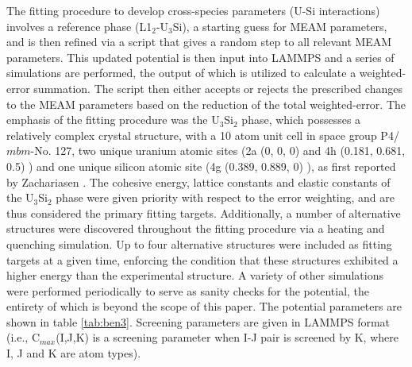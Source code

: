 \documentclass[review]{elsarticle}
\begin{document}
The fitting procedure to develop cross-species parameters (U-Si interactions) involves a reference phase (L1$_{2}$-U$_{3}$Si), a starting guess for MEAM parameters, and is then refined via a script that gives a random step to all relevant MEAM parameters.  This updated potential is then input into LAMMPS \cite{plimpton1995} and a series of simulations are performed, the output of which is utilized to calculate a weighted-error summation.  The script then either accepts or rejects the prescribed changes to the MEAM parameters based on the reduction of the total weighted-error.  The emphasis of the fitting procedure was the U$_{3}$Si$_{2}$ phase, which possesses a relatively complex crystal structure, with a 10 atom unit cell in space group P4/$\textit{mbm}$-No. 127, two unique uranium atomic sites (2a (0, 0, 0) and 4h (0.181, 0.681, 0.5) ) and one unique silicon atomic site (4g (0.389, 0.889, 0) ), as first reported by Zachariasen \cite{zachariasen1949}.    The cohesive energy, lattice constants and elastic constants of the U$_{3}$Si$_{2}$ phase were given priority with respect to the error weighting, and are thus considered the primary fitting targets.  Additionally, a number of alternative structures were discovered throughout the fitting procedure via a heating and quenching simulation.  Up to four alternative structures were included as fitting targets at a given time, enforcing the condition that these structures exhibited a higher energy than the experimental structure.  A variety of other simulations were performed periodically to serve as sanity checks for the potential, the entirety of which is beyond the scope of this paper.  The potential parameters are shown in table \ref{tab:ben3}.  Screening parameters are given in LAMMPS format (i.e., C$_{max}$(I,J,K) is a screening parameter when I-J pair is screened by K, where I, J and K are atom types).  
\end{document}
